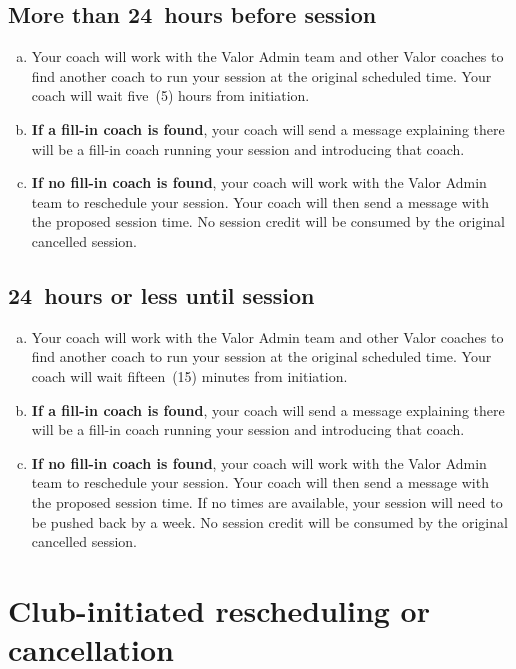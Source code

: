 \documentclass[10pt]{article}
\begin{document}
\subsection{More than 24~hours before session}
\begin{enumerate}[(a)]
\item
Your coach will work with the Valor Admin team and other Valor coaches to find another coach to run your session at the original scheduled time. Your coach will wait five~(5) hours from initiation.

\item
\textbf{If a fill-in coach is found}, your coach will send a message explaining there will be a fill-in coach running your session and introducing that coach.

\item
\textbf{If no fill-in coach is found}, your coach will work with the Valor Admin team to reschedule your session. Your coach will then send a message with the proposed session time. No session credit will be consumed by the original cancelled session.
\end{enumerate}

\subsection{24~hours or less until session}
\begin{enumerate}[(a)]
\item
Your coach will work with the Valor Admin team and other Valor coaches to find another coach to run your session at the original scheduled time. Your coach will wait fifteen~(15) minutes from initiation.

\item
\textbf{If a fill-in coach is found}, your coach will send a message explaining there will be a fill-in coach running your session and introducing that coach.

\item
\textbf{If no fill-in coach is found}, your coach will work with the Valor Admin team to reschedule your session. Your coach will then send a message with the proposed session time. If no times are available, your session will need to be pushed back by a week. No session credit will be consumed by the original cancelled session.
\end{enumerate}


\section{Club-initiated rescheduling or cancellation}
\end{document}
